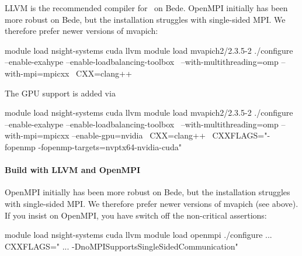 LLVM is the recommended compiler for \Peano\ on Bede. 
OpenMPI initially has been more robust on Bede, but the installation struggles
with single-sided MPI. 
We therefore prefer newer versions of mvapich:

\begin{code}
module load nsight-systems cuda llvm
module load mvapich2/2.3.5-2 
./configure --enable-exahype --enable-loadbalancing-toolbox \
 --with-multithreading=omp  --with-mpi=mpicxx \
 CXX=clang++
\end{code}

\noindent
The GPU support is added via 
\begin{code}
module load nsight-systems cuda llvm
module load mvapich2/2.3.5-2 
./configure --enable-exahype --enable-loadbalancing-toolbox \
 --with-multithreading=omp  --with-mpi=mpicxx --enable-gpu=nvidia \
 CXX=clang++ \
 CXXFLAGS="-fopenmp -fopenmp-targets=nvptx64-nvidia-cuda"
\end{code}


 

  

\paragraph{Build with LLVM and OpenMPI}

OpenMPI initially has been more robust on Bede, but the installation struggles
with single-sided MPI. 
We therefore prefer newer versions of mvapich (see above).
If you insist on OpenMPI, you have switch off the non-critical assertions:

\begin{code}
module load nsight-systems cuda llvm
module load openmpi
./configure ... CXXFLAGS=" ... -DnoMPISupportsSingleSidedCommunication"
\end{code}





